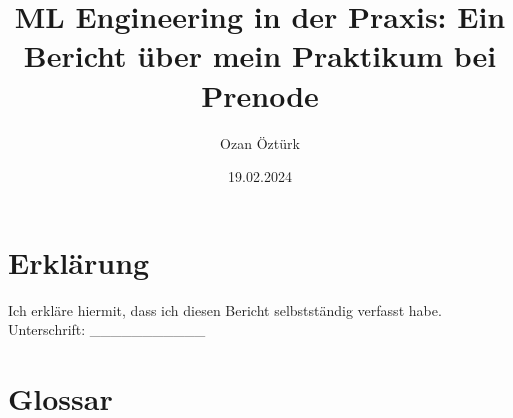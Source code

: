 \documentclass[11pt]{article}
\title{ML Engineering in der Praxis: Ein Bericht über mein Praktikum bei Prenode}
\author{Ozan Öztürk}
\date{19.02.2024}
\begin{document}
\linespread{1.5}

\maketitle

\section*{Erklärung}
Ich erkläre hiermit, dass ich diesen Bericht selbstständig verfasst habe. \\
Unterschrift: \_\_\_\_\_\_\_\_\_\_\_

\newpage

\tableofcontents
\newpage

\section*{Glossar}
\end{document}
